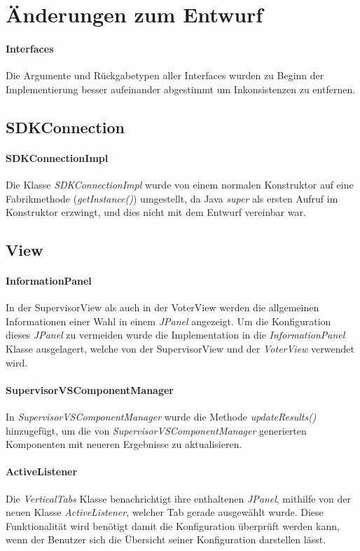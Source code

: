 \documentclass[parskip=full]{scrartcl}
\begin{document}
\section{Änderungen zum Entwurf}
\paragraph{Interfaces}
Die Argumente und Rückgabetypen aller Interfaces wurden zu Beginn der Implementierung besser aufeinander abgestimmt um Inkonsistenzen zu entfernen.

\subsection{SDKConnection}

\paragraph{SDKConnectionImpl}
Die Klasse \textit{SDKConnectionImpl} wurde von einem normalen Konstruktor auf eine Fabrikmethode (\textit{getInstance()}) umgestellt, da Java \textit{super} als ersten Aufruf im Konstruktor erzwingt, und dies nicht mit dem Entwurf vereinbar war.

\subsection{View}

\paragraph{InformationPanel}
In der SupervisorView als auch in der VoterView werden die allgemeinen Informationen einer Wahl in einem \textit{JPanel} angezeigt. Um die Konfiguration dieses \textit{JPanel} zu vermeiden wurde die Implementation in die \textit{InformationPanel} Klasse ausgelagert, welche von der SupervisorView und der \textit{VoterView} verwendet wird. 

\paragraph{SupervisorVSComponentManager}
In \textit{SupervisorVSComponentManager} wurde die Methode \textit{updateResults()} hinzugefügt, um die von \textit{SupervisorVSComponentManager} generierten Komponenten mit neueren Ergebnisse zu aktualisieren.

\paragraph{ActiveListener}
Die \textit{VerticalTabs} Klasse benachrichtigt ihre enthaltenen \textit{JPanel}, mithilfe von der neuen Klasse \textit{ActiveListener}, welcher Tab gerade ausgewählt wurde. Diese Funktionalität wird benötigt damit die Konfiguration überprüft werden kann, wenn der Benutzer sich die Übersicht seiner Konfiguration darstellen lässt. 
\end{document}
